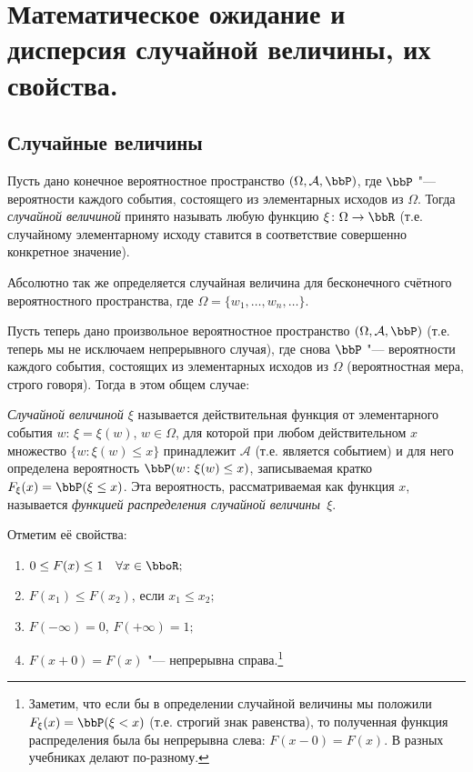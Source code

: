 \chapter{Математическое ожидание и дисперсия случайной величины, их свойства.}
\section{Случайные величины}

Пусть дано конечное вероятностное пространство $(\Omega,\mathcal A, \bbP)$, где $\bbP$ "--- вероятности каждого события, состоящего из элементарных исходов из $\Omega$. Тогда \textit{случайной величиной} принято называть любую функцию $\xi\colon \Omega \to \bbR$ (т.е. случайному элементарному исходу ставится в соответствие совершенно конкретное значение).

Абсолютно так же определяется случайная величина для бесконечного счётного вероятностного пространства, где $\Omega = \{w_1,\dots, w_n,\dots\}$.

Пусть теперь дано произвольное вероятностное пространство $(\Omega,\mathcal A, \bbP)$ (т.е. теперь мы не исключаем непрерывного случая), где снова $\bbP$ "--- вероятности каждого события, состоящих из элементарных исходов из $\Omega$ (вероятностная мера, строго говоря). Тогда в этом общем случае:
\begin{defn}
\textit{Случайной величиной $\xi$} называется действительная функция от элементарного события $w$: $\xi = \xi(w)$, $w\in\Omega$, для которой при любом действительном $x$ множество $\{w\colon \xi(w) \le x\}$ принадлежит $\mathcal A$ (т.е. является событием) и для него определена вероятность $\bbP(w\colon \xi(w) \le x)$, записываемая кратко $F_\xi(x)=\bbP(\xi \le x)$. Эта вероятность, рассматриваемая как функция $x$, называется \textit{функцией распределения случайной величины~$\xi$}.
\end{defn}
Отметим её свойства:
\begin{enumerate}
\item 
$0 \le F(x) \le 1\quad \forall x \in \bboR;$ 
\item
$F(x_1) \le F(x_2)$, если $x_1\le x_2;$
\item
$F(-\infty)=0$, $F(+\infty)=1;$
\item
$F(x+0)=F(x)$ "--- непрерывна справа.\footnote{Заметим, что если бы в определении случайной величины мы положили $F_\xi(x)=\bbP(\xi < x)$ (т.е. строгий знак равенства), то полученная функция распределения была бы непрерывна слева: $F(x-0)=F(x)$. В разных учебниках делают по-разному.}
\end{enumerate}

